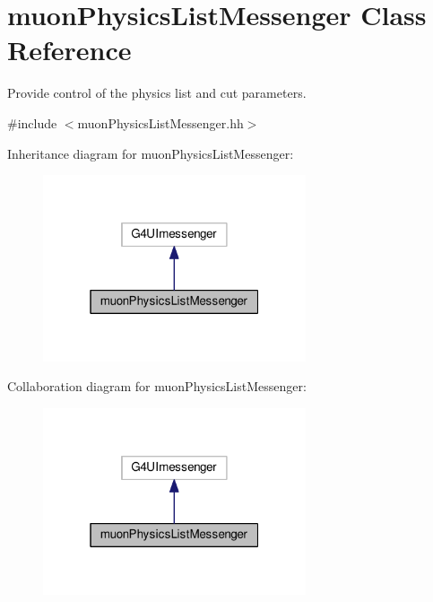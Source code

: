 \hypertarget{classmuonPhysicsListMessenger}{}\section{muon\+Physics\+List\+Messenger Class Reference}
\label{classmuonPhysicsListMessenger}


Provide control of the physics list and cut parameters.  




{\ttfamily \#include $<$muon\+Physics\+List\+Messenger.\+hh$>$}



Inheritance diagram for muon\+Physics\+List\+Messenger\+:\nopagebreak
\begin{figure}[H]
\begin{center}
\leavevmode
\includegraphics[width=220pt]{classmuonPhysicsListMessenger__inherit__graph}
\end{center}
\end{figure}


Collaboration diagram for muon\+Physics\+List\+Messenger\+:\nopagebreak
\begin{figure}[H]
\begin{center}
\leavevmode
\includegraphics[width=220pt]{classmuonPhysicsListMessenger__coll__graph}
\end{center}
\end{figure}
